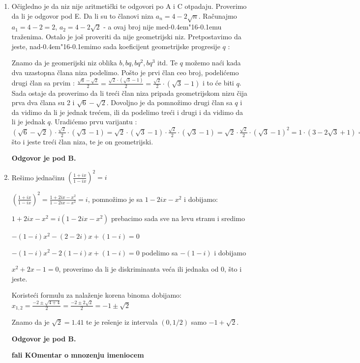 \documentclass[a4paper,12pt]{report}
\def\dj{d\kern-0.4em\char"16\kern-0.1em}
\begin{document}
\begin{enumerate}[1.]
\item O\v{c}igledno je da niz nije aritmeti\v{c}ki te odgovori po A i C otpadaju. Proverimo da li je odgovor pod E. Da li su to \v{c}lanovi niza $a_n = 4 - 2\sqrt{n} $. Ra\v{c}unajmo $a_1 = 4-2 = 2$, $a_2 = 4 - 2\sqrt{2}$ - a ovaj broj nije me\dj{}u tra\v{z}enima. Ostalo je jo\v{s} proveriti da nije geometrijski niz. Pretpostavimo da jeste, na\dj{}imo sada koeficijent geometrijske progresije $q$ :
\par Znamo da je geomerijski niz oblika $b, bq, bq^2, bq^3$ itd. Te $q$ mo\v{z}emo na\'{c}i kada dva uzastopna \v{c}lana niza podelimo. Po\v{s}to je prvi \v{c}lan ceo broj, podeli\'{c}emo drugi \v{c}lan sa prvim : $ \frac{\sqrt{6} - \sqrt{2}}{2} = \frac{\sqrt{2} \cdot (\sqrt{3} - 1)}{2} =\frac{\sqrt{2}}{2} \cdot (\sqrt{3} - 1) $ i to \'{c}e biti $q$. Sada ostaje da proverimo da li tre\'{c}i \v{c}lan niza pripada geometrijskom nizu \v{c}ija prva dva \v{c}lana su 2 i $\sqrt{6} - \sqrt{2}$. Dovoljno je da pomno\v{z}imo drugi \v{c}lan sa $q$ i da vidimo da li je jednak tre\'{c}em, ili da podelimo tre\'{c}i i drugi i da vidimo da li je jednak $q$. Uradi\'{c}emo prvu varijantu : $(\sqrt{6} - \sqrt{2}) \cdot \frac{\sqrt{2}}{2} \cdot (\sqrt{3} - 1) = \sqrt{2} \cdot (\sqrt{3} - 1) \cdot \frac{\sqrt{2}}{2} \cdot (\sqrt{3} - 1) = \sqrt{2} \cdot \frac{\sqrt{2}}{2} \cdot (\sqrt{3} - 1)^2 = 1 \cdot (3 - 2\sqrt{3} + 1) = 4 - 2\sqrt{2}$ \v{s}to i jeste tre\'{c}i \v{c}lan niza, te je on geometrijski. \par \textbf{Odgovor je pod B.}

\item Re\v{s}imo jedna\v{c}inu $(\frac{1 + ix}{1 - ix})^2 = i $
\par $(\frac{1 + ix}{1 - ix})^2 =\frac{1 +2ix -x^2}{1 -2ix - x^2} = i $, pomno\v{z}imo je sa $1 - 2ix -x^2$ i dobijamo:
\par $1 +2ix -x^2 = i(1 - 2ix -x^2)$ prebacimo sada sve na levu stranu i sredimo
\par $-(1-i)x^2 -(2-2i)x + (1-i) = 0$
\par $-(1-i)x^2 -2(1-i)x + (1-i) = 0$ podelimo sa $-(1-i)$ i dobijamo
\par $x^2 +2x -1 = 0$, proverimo da li je diskriminanta ve\'{c}a ili jednaka od 0, \v{s}to i jeste.
\par Koriste\'{c}i formulu za nala\v{z}enje korena binoma dobijamo: $x_{1,2} = \frac{-2 \pm \sqrt{4 + 4}}{2} = \frac{-2 \pm 2\sqrt{2}}{2} = -1 \pm \sqrt{2}$
\par Znamo da je $\sqrt{2} = 1.41$ te je re\v{s}enje iz intervala $(0,1/2)$ samo $-1 + \sqrt{2}$.
\par \textbf{Odgovor je pod B.}
\par  \textbf{fali KOmentar o mnozenju imeniocem}


\end{enumerate}
\end{document}
